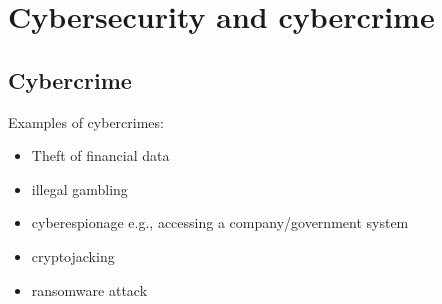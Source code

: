\documentclass[a4paper]{article}
\theoremstyle{plain}
\theoremstyle{definition}
\theoremstyle{remark}
\begin{document}
	\section{Cybersecurity and cybercrime}
	\subsection{Cybercrime}
	
	Examples of cybercrimes:
	\begin{itemize}
		\item Theft of financial data
		\item illegal gambling
		\item cyberespionage e.g., accessing  a company/government system
		\item cryptojacking
		\item ransomware attack
	\end{itemize}
\end{document}
